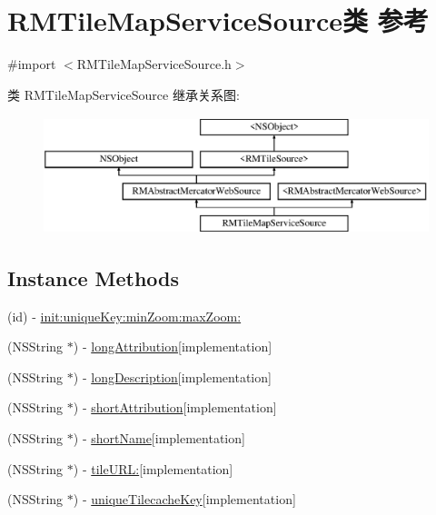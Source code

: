 \hypertarget{interface_r_m_tile_map_service_source}{\section{R\-M\-Tile\-Map\-Service\-Source类 参考}
\label{interface_r_m_tile_map_service_source}
}


{\ttfamily \#import $<$R\-M\-Tile\-Map\-Service\-Source.\-h$>$}

类 R\-M\-Tile\-Map\-Service\-Source 继承关系图\-:\begin{figure}[H]
\begin{center}
\leavevmode
\includegraphics[height=3.425076cm]{interface_r_m_tile_map_service_source}
\end{center}
\end{figure}
\subsection*{Instance Methods}
\begin{DoxyCompactItemize}
\item 
(id) -\/ \hyperlink{interface_r_m_tile_map_service_source_ad4ddca5b7a248ee4ea6b5ac84b1f39fc}{init\-:unique\-Key\-:min\-Zoom\-:max\-Zoom\-:}
\item 
(N\-S\-String $\ast$) -\/ \hyperlink{interface_r_m_tile_map_service_source_af3e82c8c50ff4d3c6d8aa4940c0bbfd0}{long\-Attribution}{\ttfamily  \mbox{[}implementation\mbox{]}}
\item 
(N\-S\-String $\ast$) -\/ \hyperlink{interface_r_m_tile_map_service_source_ad8821cb88d0e55e2f8cce4bb2a080209}{long\-Description}{\ttfamily  \mbox{[}implementation\mbox{]}}
\item 
(N\-S\-String $\ast$) -\/ \hyperlink{interface_r_m_tile_map_service_source_ae40c5f9b838f852cb7c0943d0596c056}{short\-Attribution}{\ttfamily  \mbox{[}implementation\mbox{]}}
\item 
(N\-S\-String $\ast$) -\/ \hyperlink{interface_r_m_tile_map_service_source_ab6d355147c5578e213f8b822d7cc4753}{short\-Name}{\ttfamily  \mbox{[}implementation\mbox{]}}
\item 
(N\-S\-String $\ast$) -\/ \hyperlink{interface_r_m_tile_map_service_source_a39aafcbb0907cfcca9df0f9708434f6b}{tile\-U\-R\-L\-:}{\ttfamily  \mbox{[}implementation\mbox{]}}
\item 
(N\-S\-String $\ast$) -\/ \hyperlink{interface_r_m_tile_map_service_source_a80f88caa0b6ea9310552e62714522348}{unique\-Tilecache\-Key}{\ttfamily  \mbox{[}implementation\mbox{]}}
\end{DoxyCompactItemize}
